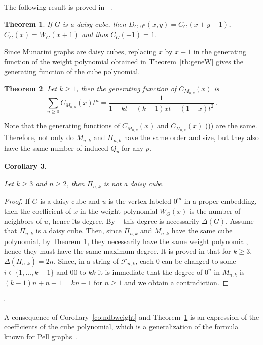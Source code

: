 \documentclass[11pt]{article}
\newtheorem{theorem}{\bf Theorem}[section]
\newtheorem{corollary}[theorem]{\bf Corollary}
\newcommand{\qed}{\hfill $\square$ \bigskip}
\newcommand{\Fib}{{\mathcal F}}
\begin{document}
The following result is proved in ~\cite{KM-2019a}.


\begin{theorem}
\label{th:DfromCandCfromW}
If $G$ is a daisy cube, then $D_{G,0^n} (x,y)= C_{G}(x+y-1)$, $C_{G}(x)=W_{G}(x+1)$ and thus $ C_{G}(-1)=1$.  
\end{theorem}

Since Munarini graphs are daisy cubes, replacing $x$ by $x + 1$ in the generating function of the weight polynomial obtained in
Theorem~\ref{th:geneW} gives the generating function of the cube polynomial.

\begin{theorem}\label{th:geneC}
Let $k\geq1$, then the generating function of $C_{M_{n,k}}(x)$ is 
$$ \sum_{n\geq0}{ C_{M_{n,k}}(x)t^n}=\frac{1}{1-kt-(k-1)x t -(1+x)t^2}\,.$$
\end{theorem}
 
Note that the generating functions of $C_{M_{n,k}}(x)$ and $C_{\Pi_{n,k}}(x)$ (\cite[Proposition~5.2]{IKT-2023}))
are the same. Therefore, not only do $M_{n,k}$ and $\Pi_{n,k}$ have the same order and size, but they also have the same number of induced $Q_p$ for any $p$.

\begin{corollary}\label{co:notdaisycube}

Let $k\geq3$ and $n\geq2$, then $\Pi_{n,k}$ is not a daisy cube.
\end{corollary}
\begin{proof}
If $G$ is a daisy cube and $u$ is the vertex labeled $0^m$ in a proper embedding, then the coefficient of $x$ in the weight polynomial $W_G(x)$ is the number of neighbors of $u$, hence its degree. By  
~\cite[Corollary 2.3]{T-2020a} this degree is necessarily $\Delta(G)$. Assume that $\Pi_{n,k}$ is a daisy cube. Then, since $\Pi_{n,k}$ and $M_{n,k}$ have the same cube polynomial, by Theorem~\ref{th:DfromCandCfromW}, they necessarily have the same weight polynomial, hence they must have the same maximum degree.  It is proved in \cite[Corollary~5.5]{IKT-2023} that for $k\geq3$, $\Delta(\Pi_{n,k})=2n$. Since, in a string of $\Fib_{n,k}$, each $0$ can be changed to some $i\in\{1,\ldots,k-1\}$ and $00$ to $kk$ it is immediate that the degree of $0^n$ in $M_{n,k}$ is  $(k-1)n+n-1=kn-1$ for $n \geq1$ and  we obtain a contradiction. 
\end{proof}
\qed

A consequence of Corollary~\ref{co:ndbweight} and Theorem~\ref{th:DfromCandCfromW} is an expression of the coefficients of the cube polynomial, which is a generalization of the formula known for Pell graphs~\cite[Equation (14)]{M-2019}.
\end{document}
